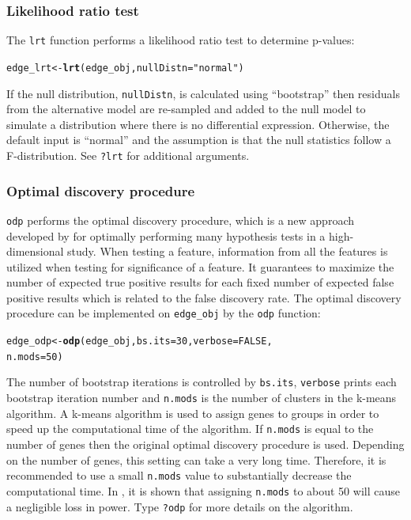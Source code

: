 \documentclass{article}\usepackage[]{graphicx}\usepackage[]{color}
\makeatletter
\newcommand{\hlnum}[1]{\textcolor[rgb]{0.686,0.059,0.569}{#1}}%
\newcommand{\hlstr}[1]{\textcolor[rgb]{0.192,0.494,0.8}{#1}}%
\newcommand{\hlstd}[1]{\textcolor[rgb]{0.345,0.345,0.345}{#1}}%
\newcommand{\hlkwb}[1]{\textcolor[rgb]{0.69,0.353,0.396}{#1}}%
\newcommand{\hlkwc}[1]{\textcolor[rgb]{0.333,0.667,0.333}{#1}}%
\newcommand{\hlkwd}[1]{\textcolor[rgb]{0.737,0.353,0.396}{\textbf{#1}}}%
\newenvironment{kframe}{%
 \def\at@end@of@kframe{}%
 \ifinner\ifhmode%
  \def\at@end@of@kframe{\end{minipage}}%
  \begin{minipage}{\columnwidth}%
 \fi\fi%
 \def\FrameCommand##1{\hskip\@totalleftmargin \hskip-\fboxsep
 \colorbox{shadecolor}{##1}\hskip-\fboxsep
     \hskip-\linewidth \hskip-\@totalleftmargin \hskip\columnwidth}%
 \MakeFramed {\advance\hsize-\width
   \@totalleftmargin\z@ \linewidth\hsize
   \@setminipage}}%
 {\par\unskip\endMakeFramed%
 \at@end@of@kframe}
\newenvironment{knitrout}{}{} %
\makeatother
\begin{document}
\subsubsection{Likelihood ratio test}
The {\tt lrt} function performs a likelihood ratio test to determine p-values:
\begin{knitrout}
\color{fgcolor}\begin{kframe}
\begin{alltt}
\hlstd{edge_lrt} \hlkwb{<-} \hlkwd{lrt}\hlstd{(edge_obj,} \hlkwc{nullDistn} \hlstd{=} \hlstr{"normal"}\hlstd{)}
\end{alltt}
\end{kframe}
\end{knitrout}
If the null distribution, {\tt nullDistn}, is calculated using ``bootstrap'' then residuals from the alternative model are re-sampled and added to the null model to simulate a distribution where there is no differential expression. Otherwise, the default input is ``normal'' and the assumption is that the null statistics follow a F-distribution. See {\tt ?lrt} for additional arguments.

\subsubsection{Optimal discovery procedure}
{\tt odp} performs the optimal discovery procedure, which is a new approach developed by \cite{storey:2005} for optimally performing many hypothesis tests in a high-dimensional study. When testing a feature, information from all the features is utilized when testing for significance of a feature. It guarantees to maximize the number of expected true positive results for each fixed number of expected false positive results which is related to the false discovery rate. The optimal discovery procedure can be implemented on {\tt edge\_obj} by the {\tt odp} function:
\begin{knitrout}
\color{fgcolor}\begin{kframe}
\begin{alltt}
\hlstd{edge_odp} \hlkwb{<-} \hlkwd{odp}\hlstd{(edge_obj,} \hlkwc{bs.its} \hlstd{=} \hlnum{30}\hlstd{,} \hlkwc{verbose} \hlstd{=} \hlnum{FALSE}\hlstd{,}
    \hlkwc{n.mods} \hlstd{=} \hlnum{50}\hlstd{)}
\end{alltt}
\end{kframe}
\end{knitrout}
The number of bootstrap iterations is controlled by {\tt bs.its}, {\tt verbose} prints each bootstrap iteration number and {\tt n.mods} is the number of clusters in the k-means algorithm. A k-means algorithm is used to assign genes to groups in order to speed up the computational time of the algorithm. If {\tt n.mods} is equal to the number of genes then the original optimal discovery procedure is used. Depending on the number of genes, this setting can take a very long time.  Therefore, it is recommended to use a small {\tt n.mods} value to substantially decrease the computational time. In \cite{woo:leek:storey:2011}, it is shown that assigning {\tt n.mods} to about 50 will cause a negligible loss in power. Type {\tt ?odp} for more details on the algorithm.
\end{document}
